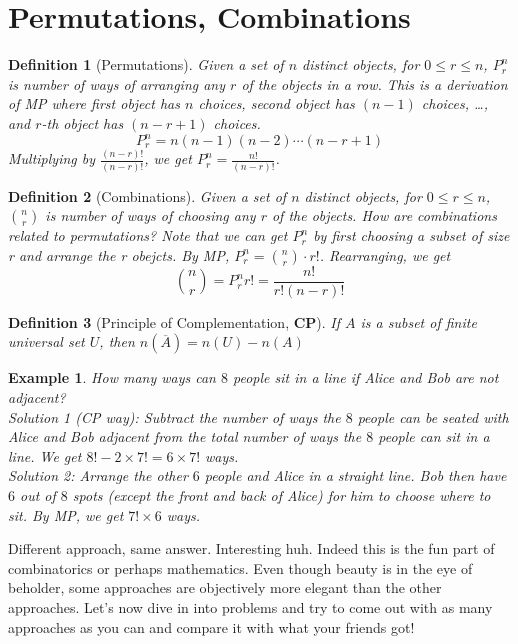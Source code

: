 \documentclass[11pt,a5paper]{article}
\newtheorem{definition}{Definition}
\newtheorem{example}{Example}
\begin{document}
\section{Permutations, Combinations}

\begin{definition}[Permutations]
Given a set of $n$ distinct objects, for $0 \le r \le n$, $P_r^n$ is number of ways of arranging any $r$ of the objects in a row. This is a derivation of MP where first object has $n$ choices, second object has $(n-1)$ choices, …, and $r$-th object has $(n-r+1)$ choices.
\[P_r^n=n(n-1)(n-2)\cdots(n-r+1)\]
Multiplying by $\frac{(n-r)!}{(n-r)!}$, we get $P_r^n = \frac{n!}{(n-r)!}$.
\end{definition}

\begin{definition}[Combinations]
Given a set of $n$ distinct objects, for $0 \le r \le n$, $n \choose r$ is number of ways of choosing any $r$ of the objects. How are combinations related to permutations? Note that we can get $P_r^n$ by first choosing a subset of size r and arrange the r obejcts. By MP, $P_r^n = {n \choose r} \cdot r!$. Rearranging, we get \[{n \choose r} = P_r^n r!= \frac{n!}{r!(n-r)!}\]
\end{definition}

\begin{definition}[Principle of Complementation, \textbf{CP}]
If $A$ is a subset of finite universal set $U$, then $n(\overline{A}) = n(U) - n(A)$
\end{definition}

\begin{example}
How many ways can $8$ people sit in a line if Alice and Bob are not adjacent? \\
\textit{Solution 1 (CP way)}: Subtract the number of ways the $8$ people can be seated with Alice and Bob adjacent from the total number of ways the $8$ people can sit in a line. We get $8!- 2 \times 7! = 6 \times 7!$ ways. \\
\textit{Solution 2}: Arrange the other $6$ people and Alice in a straight line. Bob then have $6$ out of $8$ spots (except the front and back of Alice) for him to choose where to sit. By MP, we get $7! \times 6$ ways.   
\end{example}

\noindent Different approach, same answer. Interesting huh. Indeed this is the fun part of combinatorics or perhaps mathematics. Even though beauty is in the eye of beholder, some approaches are objectively more elegant than the other approaches. Let's now dive in into problems and try to come out with as many approaches as you can and compare it with what your friends got!
\end{document}
